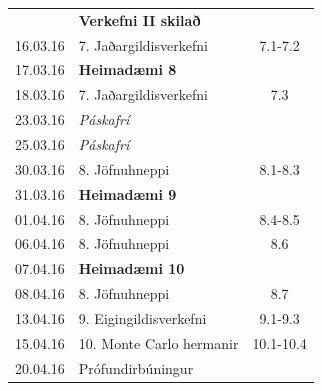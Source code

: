 \documentclass[letterpaper,10pt,icelandic]{sphinxmanual}
\begin{document}
\begin{center}
\begin{tabular}{c|l|c}
		& \textbf{Verkefni II skilað} & \\
		16.03.16 & 7. Jaðargildisverkefni & 7.1-7.2\\
		17.03.16 & \textbf{Heimadæmi 8} & \\
		18.03.16 & 7. Jaðargildisverkefni & 7.3\\\hline
		23.03.16 & \emph{Páskafrí} & \\
		25.03.16 & \emph{Páskafrí} & \\\hline
		30.03.16 & 8. Jöfnuhneppi & 8.1-8.3\\
		31.03.16 & \textbf{Heimadæmi 9} &\\
		01.04.16 & 8. Jöfnuhneppi & 8.4-8.5\\\hline
		06.04.16 & 8. Jöfnuhneppi & 8.6\\
		07.04.16 & \textbf{Heimadæmi 10}\\
		08.04.16 & 8. Jöfnuhneppi & 8.7\\\hline
		13.04.16 & 9. Eigingildisverkefni & 9.1-9.3\\
		15.04.16 & 10. Monte Carlo hermanir & 10.1-10.4\\\hline
		20.04.16 & Prófundirbúningur & \\\hline
	\end{tabular}
\end{center}
\end{document}
